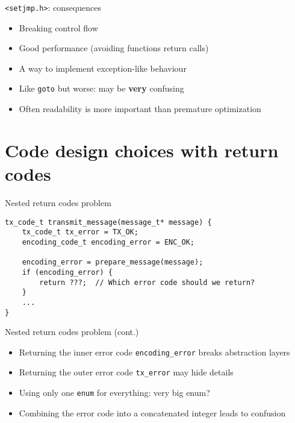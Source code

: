 \documentclass[aspectratio=169,14pt]{beamer}
\begin{document}
\begin{frame}{\texttt{<setjmp.h>}: consequences}
\begin{itemize}
    \item[\good] Breaking control flow
    \item[\good] Good performance (avoiding functions return calls)
    \item[\good] A way to implement exception-like behaviour
    \item[\bad] Like \texttt{goto} but worse: may be \textbf{very} confusing
    \item[\bad] Often readability is more important than premature optimization
\end{itemize}
\end{frame}






\section{Code design choices with return codes}

\begin{frame}[fragile]{Nested return codes problem}
\begin{lstlisting}[style=cstyle]
tx_code_t transmit_message(message_t* message) {
    tx_code_t tx_error = TX_OK;
    encoding_code_t encoding_error = ENC_OK;
    
    encoding_error = prepare_message(message);
    if (encoding_error) {
        return ???;  // Which error code should we return?
    }
    ...
}
\end{lstlisting}
\end{frame}



\begin{frame}{Nested return codes problem (cont.)}
\begin{itemize}
    \item Returning the inner error code \texttt{encoding\_error} breaks abstraction layers
    \item Returning the outer error code \texttt{tx\_error} may hide details
    \item Using only one \texttt{enum} for everything: very big enum?
    \item Combining the error code into a concatenated integer leads to confusion
\end{itemize}
\end{frame}
\end{document}
